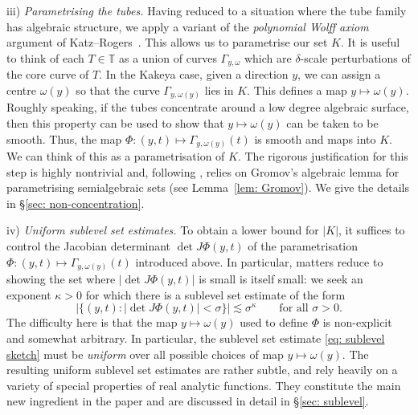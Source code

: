 \documentclass[reqno]{amsart}
\numberwithin{equation}{section}
\newcommand{\T}{\mathbb{T}}
\theoremstyle{plain}
\theoremstyle{definition}
\begin{document}
\noindent iii) \textit{Parametrising the tubes.} Having reduced to a situation where the tube family has algebraic structure, we apply a variant of the \textit{polynomial Wolff axiom} argument of Katz--Rogers~\cite{KR2018}. This allows us to parametrise our set $K$. It is useful to think of each $T \in \T$ as a union of curves $\Gamma_{y,\omega}$ which are $\delta$-scale perturbations of the core curve of $T$. In the Kakeya case, given a direction $y$, we can assign a centre $\omega(y)$ so that the curve $\Gamma_{y, \omega(y)}$ lies in $K$. This defines a map $y \mapsto \omega(y)$. Roughly speaking, if the tubes concentrate around a low degree algebraic surface, then this property can be used to show that $y \mapsto \omega(y)$ can be taken to be smooth. Thus, the map $\Phi \colon (y, t) \mapsto \Gamma_{y, \omega(y)}(t)$ is smooth and maps into $K$. We can think of this as a parametrisation of $K$. The rigorous justification for this step is highly nontrivial and, following \cite{KR2018}, relies on Gromov's algebraic lemma for parametrising semialgebraic sets (see Lemma~\ref{lem: Gromov}). We give the details in \S\ref{sec: non-concentration}.\medskip
    
\noindent iv)  \textit{Uniform sublevel set estimates.} To obtain a lower bound for $|K|$, it suffices to control the Jacobian determinant $\det J\Phi(y,t)$ of the parametrisation $\Phi \colon (y, t) \mapsto \Gamma_{y, \omega(y)}(t)$ introduced above. In particular, matters reduce to showing the set where $|\det J\Phi(y,t)|$ is small is itself small: we seek an exponent $\kappa > 0$ for which there is a sublevel set estimate of the form
    \begin{equation}\label{eq: sublevel sketch}
        |\{ (y, t) : |\det J\Phi(y,t)| < \sigma \}| \lesssim \sigma^{\kappa} \qquad \textrm{for all $\sigma > 0$.}
    \end{equation}
    The difficulty here is that the map $y \mapsto \omega(y)$ used to define $\Phi$ is non-explicit and somewhat arbitrary. In particular, the sublevel set estimate \eqref{eq: sublevel sketch} must be \textit{uniform} over all possible choices of map $y \mapsto \omega(y)$. The resulting uniform sublevel set estimates are rather subtle, and rely heavily on a variety of special properties of real analytic functions. They constitute the main new ingredient in the paper and are discussed in detail in \S\ref{sec: sublevel}.




\end{document}
